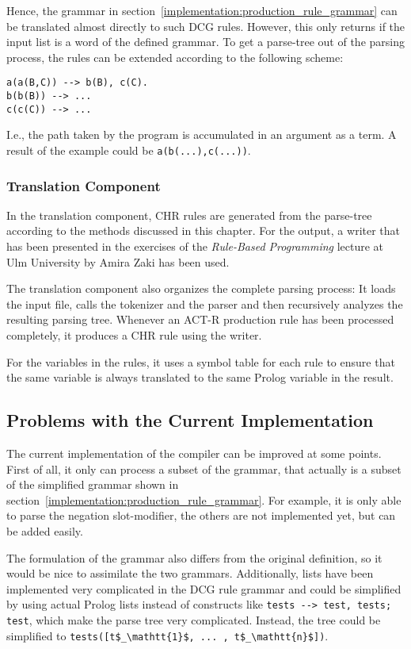 Hence, the grammar in section~\ref{implementation:production_rule_grammar} can be translated almost directly to such DCG rules. However, this only returns if the input list is a word of the defined grammar. To get a parse-tree out of the parsing process, the rules can be extended according to the following scheme:

\begin{lstlisting}
a(a(B,C)) --> b(B), c(C).
b(b(B)) --> ...
c(c(C)) --> ...
\end{lstlisting}

I.e., the path taken by the program is accumulated in an argument as a term. A result of the example could be \lstinline|a(b(...),c(...))|.

\subsubsection{Translation Component}

In the translation component, CHR rules are generated from the parse-tree according to the methods discussed in this chapter. For the output, a writer that has been presented in the exercises of the \emph{Rule-Based Programming} lecture at Ulm University by Amira Zaki \cite{chr_homepage} has been used.

The translation component also organizes the complete parsing process: It loads the input file, calls the tokenizer and the parser and then recursively analyzes the resulting parsing tree. Whenever an ACT-R production rule has been processed completely, it produces a CHR rule using the writer.

For the variables in the rules, it uses a symbol table for each rule to ensure that the same variable is always translated to the same Prolog variable in the result.

\subsection{Problems with the Current Implementation}
\label{implementation:compiler:problems}

The current implementation of the compiler can be improved at some points. First of all, it only can process a subset of the grammar, that actually is a subset of the simplified grammar shown in section~\ref{implementation:production_rule_grammar}. For example, it is only able to parse the negation slot-modifier, the others are not implemented yet, but can be added easily.

The formulation of the grammar also differs from the original definition, so it would be nice to assimilate the two grammars. Additionally, lists have been implemented very complicated in the DCG rule grammar and could be simplified by using actual Prolog lists instead of constructs like \lstinline|tests --> test, tests; test|, which make the parse tree very complicated. Instead, the tree could be simplified to \lstinline[mathescape]|tests([t$_\mathtt{1}$, ... , t$_\mathtt{n}$])|.


